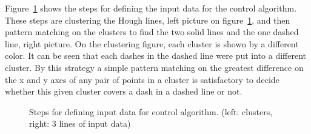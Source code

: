 \documentclass[Report.tex]{subfiles}
\begin{document}
Figure~\ref{fig:inputdata} shows the steps for defining the input data for the
control algorithm. These steps are clustering the Hough lines, left
picture on figure~\ref{fig:inputdata}, and then pattern matching on the
clusters to find the two solid lines and the one dashed line, right
picture. On the clustering figure, each cluster is shown by a different color.
It can be seen that each dashes in the dashed line were put into a
different cluster. By this strategy a simple pattern matching on the greatest
difference on the x and y axes of any pair of points in a cluster is
satisfactory to decide whether this given cluster covers a dash in a dashed
line or not.

\begin{figure}[hp]
  \centering
  \setlength\fboxsep{2pt}
  \setlength\fboxrule{0pt}

  \caption{Steps for defining input data for control algorithm. (left:
  clusters, right: 3 lines of input data)}
  \label{fig:inputdata}
\end{figure}
\end{document}
